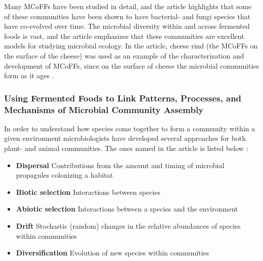 Many MCoFFs have been studied in detail, and the article highlights that some of these communities have been shown to have bacterial- and fungi species that have co-evolved over time. The microbial diversity within and across fermented foods is vast, and the article emphasizes that these communities are excellent models for studying microbial ecology. In the article, cheese rind (the MCoFFs on the surface of the cheese) was used as an example of the characterization and development of MCoFFs, since on the surface of cheese the microbial communities form as it ages \cite*{L1-FermentedFoods}.

\subsubsection*{Using Fermented Foods to Link Patterns, Processes, and Mechanisms of Microbial Community Assembly}

In order to understand how species come together to form a community within a given environment microbiologists have developed several approaches for both plant- and animal communities. The ones named in the article is listed below \cite*{L1-FermentedFoods}: 

\begin{highlight}
    \begin{itemize}
        \item \textbf{Dispersal}
        \subitem Contributions from the amount and timing of microbial propagules colonizing a habitat
        \vspace*{0.3em}

        \item \textbf{Biotic selection}
        \subitem Interactions between species
        \vspace*{0.3em}

        \item \textbf{Abiotic selection}
        \subitem Interactions between a species and the environment
        \vspace*{0.3em}

        \item \textbf{Drift}
        \subitem Stochastic (random) changes in the relative abundances of species within communities
        \vspace*{0.3em}

        \item \textbf{Diversification}
        \subitem Evolution of new species within communities
    \end{itemize}
\end{highlight}

